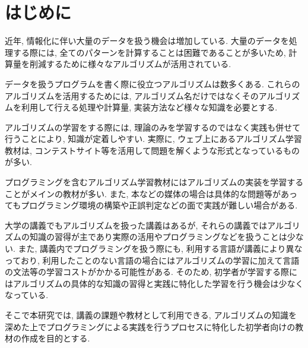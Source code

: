 \section{はじめに}

近年, 情報化に伴い大量のデータを扱う機会は増加している. 大量のデータを処理する際には, 全てのパターンを計算することは困難であることが多いため, 計算量を削減するために様々なアルゴリズムが活用されている. 

データを扱うプログラムを書く際に役立つアルゴリズムは数多くある. 
これらのアルゴリズムを活用するためには, アルゴリズム名だけではなくそのアルゴリズムを利用して行える処理や計算量, 実装方法など様々な知識を必要とする. 

アルゴリズムの学習をする際には, 理論のみを学習するのではなく実践も併せて行うことにより, 知識が定着しやすい. 
実際に, ウェブ上にあるアルゴリズム学習教材は, コンテストサイト等を活用して問題を解くような形式となっているものが多い. 

プログラミングを含むアルゴリズム学習教材にはアルゴリズムの実装を学習することがメインの教材が多い. 
また, 本などの媒体の場合は具体的な問題等があってもプログラミング環境の構築や正誤判定などの面で実践が難しい場合がある. 


大学の講義でもアルゴリズムを扱った講義はあるが, それらの講義ではアルゴリズムの知識の習得が主であり実際の活用やプログラミングなどを扱うことは少ない. 
また, 講義内でプログラミングを扱う際にも, 利用する言語が講義により異なっており, 利用したことのない言語の場合にはアルゴリズムの学習に加えて言語の文法等の学習コストがかかる可能性がある. 
そのため, 初学者が学習する際にはアルゴリズムの具体的な知識の習得と実践に特化した学習を行う機会は少なくなっている. 


そこで本研究では, 講義の課題や教材として利用できる, アルゴリズムの知識を深めた上でプログラミングによる実践を行うプロセスに特化した初学者向けの教材の作成を目的とする. 